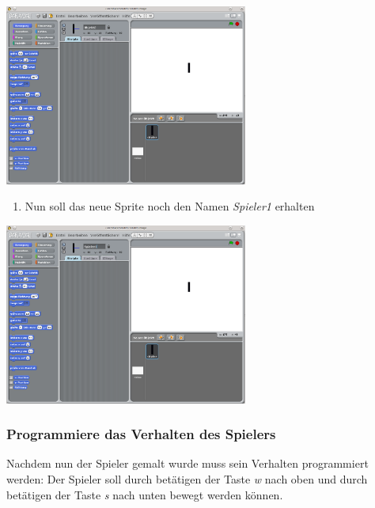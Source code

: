 \includegraphics[width=0.6\textwidth]{images/aufgabe5_pong_sprite_spieler1_1.png}
\begin{enumerate}\addtocounter{enumi}{6}
\item Nun soll das neue Sprite noch den Namen \emph{Spieler1} erhalten
\end{enumerate}
\includegraphics[width=0.6\textwidth]{images/aufgabe5_pong_sprite_spieler1_2.png}

\subsubsection{Programmiere das Verhalten des Spielers}

Nachdem nun der Spieler gemalt wurde muss sein Verhalten programmiert werden: Der Spieler soll durch betätigen der Taste \emph{w} nach oben und durch betätigen der Taste \emph{s} nach unten bewegt werden können.


